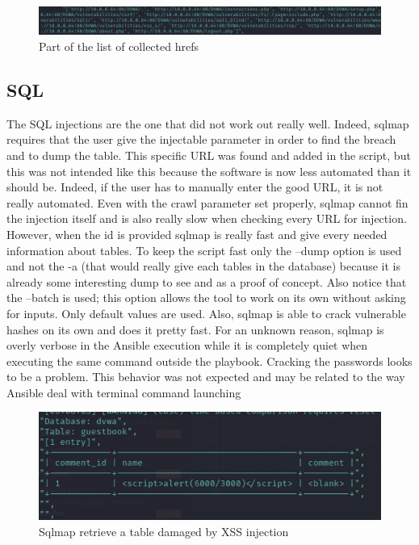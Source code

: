 \documentclass[a4paper,12pt,fleqn]{article}
\begin{document}
\begin{figure}[h]
    \centering
    \includegraphics[scale = 0.6]{images/href.png}
    \caption{Part of the list of collected hrefs}
\end{figure}

\subsection{SQL}

The SQL injections are the one that did not work out really well. Indeed, sqlmap requires that the user give the injectable parameter in order to find the breach and to dump the table. This specific URL was found and added in the script, but this was not intended like this because the software is now less automated than it should be. Indeed, if the user has to manually enter the good URL, it is not really automated. Even with the crawl parameter set properly, sqlmap cannot fin the injection itself and is also really slow when checking every URL for injection. However, when the id is provided sqlmap is really fast and give every needed information about tables. To keep the script fast only the --dump option is used and not the -a (that would really give each tables in the database) because it is already some interesting dump to see and as a proof of concept. Also notice that the --batch is used; this option allows the tool to work on its own without asking for inputs. Only default values are used. Also, sqlmap is able to crack vulnerable hashes on its own and does it pretty fast. For an unknown reason, sqlmap is overly verbose in the Ansible execution while it is completely quiet when executing the same command outside the playbook. Cracking the passwords looks to be a problem. This behavior was not expected and may be related to the way Ansible deal with terminal command launching

\begin{figure}[h]
    \centering
    \includegraphics[scale = 1]{images/sqlxss.png}
    \caption{Sqlmap retrieve a table damaged by XSS injection}
\end{figure}
\end{document}
